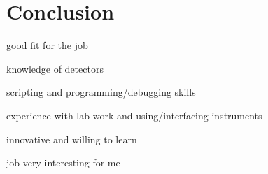 \section{Conclusion}
%
\begin{conclusion}
  \begin{tbox}[.7]
    \item good fit for the job
    \item knowledge of detectors
    \item scripting and programming/debugging skills
    \item experience with lab work and using/interfacing instruments
    \item innovative and willing to learn
    \item job very interesting for me
  \end{tbox}
\end{conclusion}
%
